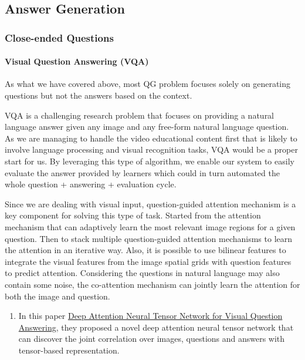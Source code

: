 \documentclass[]{book}
\providecommand{\tightlist}{%
  \setlength{\itemsep}{0pt}\setlength{\parskip}{0pt}}
\let\oldparagraph\paragraph
\renewcommand{\paragraph}[1]{\oldparagraph{#1}\mbox{}}
\theoremstyle{definition}
\theoremstyle{definition}
\theoremstyle{definition}
\theoremstyle{remark}
\begin{document}
\subsection{Answer Generation}\label{answer-generation}

\subsubsection{Close-ended Questions}\label{close-ended-questions}

\paragraph{Visual Question Answering
(VQA)}\label{visual-question-answering-vqa}

As what we have covered above, most QG problem focuses solely on
generating questions but not the answers based on the context.

VQA is a challenging research problem that focuses on providing a
natural language answer given any image and any free-form natural
language question. As we are managing to handle the video educational
content first that is likely to involve language processing and visual
recognition tasks, VQA would be a proper start for us. By leveraging
this type of algorithm, we enable our system to easily evaluate the
answer provided by learners which could in turn automated the whole
question + answering + evaluation cycle.

Since we are dealing with visual input, question-guided attention
mechanism is a key component for solving this type of task. Started from
the attention mechanism that can adaptively learn the most relevant
image regions for a given question. Then to stack multiple
question-guided attention mechanisms to learn the attention in an
iterative way. Also, it is possible to use bilinear features to
integrate the visual features from the image spatial grids with question
features to predict attention. Considering the questions in natural
language may also contain some noise, the co-attention mechanism can
jointly learn the attention for both the image and question.

\begin{enumerate}
\def\labelenumi{\arabic{enumi}.}
\tightlist
\item
  In this paper
  \href{http://openaccess.thecvf.com/content_ECCV_2018/papers/Yalong_Bai_Deep_Attention_Neural_ECCV_2018_paper.pdf}{Deep
  Attention Neural Tensor Network for Visual Question Answering}, they
  proposed a novel deep attention neural tensor network that can
  discover the joint correlation over images, questions and answers with
  tensor-based representation.
\end{enumerate}
\end{document}

